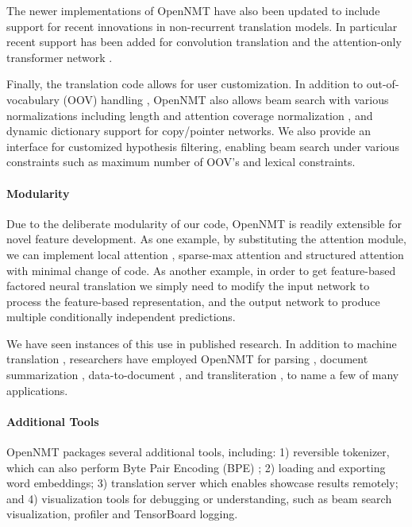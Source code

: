 \documentclass[]{article}
\begin{document}
The newer implementations of OpenNMT have also  been updated to
include support for recent innovations in  non-recurrent translation models. In
particular recent support has been added for convolution translation
\citep{gehring2017convolutional} and the attention-only transformer
network \citep{vaswani2017attention}.

Finally, the translation code allows for user customization.
In addition to out-of-vocabulary
(OOV) handling \citep{luong2015b}, OpenNMT also allows beam search
with various normalizations including length and attention coverage
normalization \citep{wu2016google}, and dynamic dictionary support for
copy/pointer networks. We also provide an interface for customized
hypothesis filtering, enabling beam search under various constraints
such as maximum number of OOV's and lexical constraints.




\paragraph{Modularity}
Due to the deliberate modularity of our code, OpenNMT is readily extensible for novel feature development. As one example, by substituting the attention module, we can implement local attention \citep{Luong2015}, sparse-max attention
\citep{martins2016softmax} and structured attention \citep{kim2017structured} with minimal change of code. As another example, in order to get feature-based factored neural translation \citep{sennrich2016linguistic} we simply need to modify the input network to process the feature-based representation, and the output network to produce multiple conditionally independent predictions.

We have seen instances of this use in published research. In addition to
machine translation
\citep{levin2017toward,ha2017effective,ma2017osu},
researchers have employed OpenNMT for parsing \citep{van2017neural},
document summarization \citep{ling2017coarse}, data-to-document
\citep{wiseman2017challenges,gardent2017webnlg}, and transliteration
\citep{ameur2017arabic}, to name a few of many applications.


\paragraph{Additional Tools}

OpenNMT packages several additional tools, including: 1) reversible tokenizer, which can also perform Byte Pair Encoding (BPE) \citep{DBLP:journals/corr/SennrichHB15}; 2) loading and exporting word embeddings; 3) translation server which enables showcase results remotely; and 4) visualization tools for debugging or understanding, such as beam search visualization, profiler and TensorBoard logging.
\end{document}
